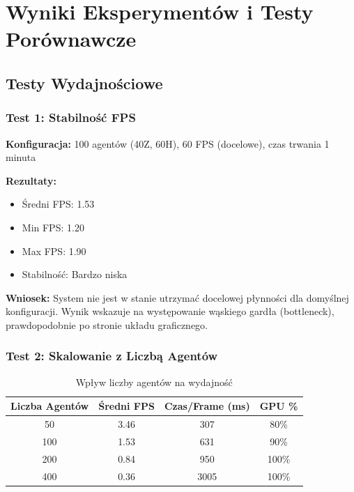 \documentclass[12pt,a4paper]{article}
\begin{document}
\newpage

\section{Wyniki Eksperymentów i Testy Porównawcze}

\subsection{Testy Wydajnościowe}

\subsubsection{Test 1: Stabilność FPS}

\textbf{Konfiguracja:} 100 agentów (40Z, 60H), 60 FPS (docelowe), czas trwania 1 minuta

\textbf{Rezultaty:}
\begin{itemize}
	\item Średni FPS: 1.53 %
	\item Min FPS: 1.20
	\item Max FPS: 1.90
	\item Stabilność: Bardzo niska
\end{itemize}

\textbf{Wniosek:} System nie jest w stanie utrzymać docelowej płynności dla domyślnej konfiguracji. Wynik wskazuje na występowanie wąskiego gardła (bottleneck), prawdopodobnie po stronie układu graficznego.

\subsubsection{Test 2: Skalowanie z Liczbą Agentów}

\begin{table}[H]
	\centering
	\begin{tabular}{|c|c|c|c|}
		\hline
		\textbf{Liczba Agentów} & \textbf{Średni FPS} & \textbf{Czas/Frame (ms)} & \textbf{GPU \%} \\
		\hline
		50                      & 3.46                & 307                      & 80\%            \\
		100                     & 1.53                & 631                      & 90\%            \\
		200                     & 0.84                & 950                      & 100\%           \\
		400                     & 0.36                & 3005                     & 100\%           \\
		\hline
	\end{tabular}
	\caption{Wpływ liczby agentów na wydajność}
\end{table}
\end{document}
